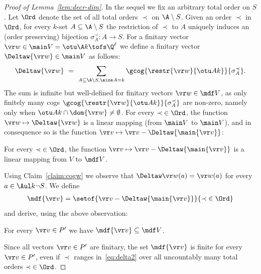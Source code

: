 \begin{proof}[Proof of Lemma~\ref{lem:decr-dim}]
In the sequel we fix an arbitrary total order on $S$.
Let $\Ord$ denote the set of all total orders $\prec$ on $\A\setminus S$.
Given an order $\prec$ in $\Ord$,
for every $k$-set $A\subseteq \A\setminus S$ the restriction of $\prec$ to $A$ 
uniquely induces an (order preserving) bijection $\sigma^\prec_A : A \to S$.
For a finitary vector $\vr w \in \main V = \otu \A k \tofs \Q^\ell$ we define a finitary vector $\Deltaw {\vr w}\in\main V$ as follows:
%
%
%
\begin{align} \label{eq:delta1}
\Deltaw {\vr w} \ = \ \sum_{A\subseteq \A \setminus S, \size A = k} \gcog {\restr{\vr w} {\otu A k}} {\sigma^\prec_A}.
\end{align}
%
The sum is infinite but well-defined for finitary vectors $\vr w\in \mdf V$, 
as only finitely many cogs $\gcog {\restr{\vr w} {\otu A k}} {\sigma^\prec_A}$ are non-zero, namely 
only when $\otu A k \cap \dom{\vr w} \neq \emptyset$.
For every $\prec \; \in \Ord$, 
the function $\vr w \mapsto \Deltaw {\vr w}$ is a linear mapping (from $\main V$ to $\main V$), and in consequence
so is the function $\vr v\mapsto \vr v - \Deltaw{\main{\vr v}}$:
%
\begin{claim} \label{claim:linmap}
For every $\prec \; \in \Ord$,
the function $\vr v \mapsto \vr v - \Deltaw{\main{\vr v}}$ is a linear mapping from $V$ to $\mdf V$.
\end{claim}
%
Using Claim~\ref{claim:cogw} we observe that
$\Deltaw \vr w(a) = \vr w(a)$ for every $a\in \Aul k {\neg S}$.
We define
%
\begin{align} \label{eq:delta2}
\mdf {\vr v} = \setof{\vr v - \Deltaw {\main{\vr v}}}{\prec \; \in \Ord}
\end{align}
%
and derive, using the above observation:
%
\begin{claim}
For every $\vr v \in P'$ we have $\mdf {\vr v} \subseteq \mdf V$.
\end{claim}
%
Since all vectors $\vr v \in P'$ are finitary,
the set $\mdf {\vr v}$ is finite for every $\vr v \in P'$, even if $\prec$ ranges in~\eqref{eq:delta2} over
all uncountably many total orders $\prec \; \in \Ord$.


\end{proof}

